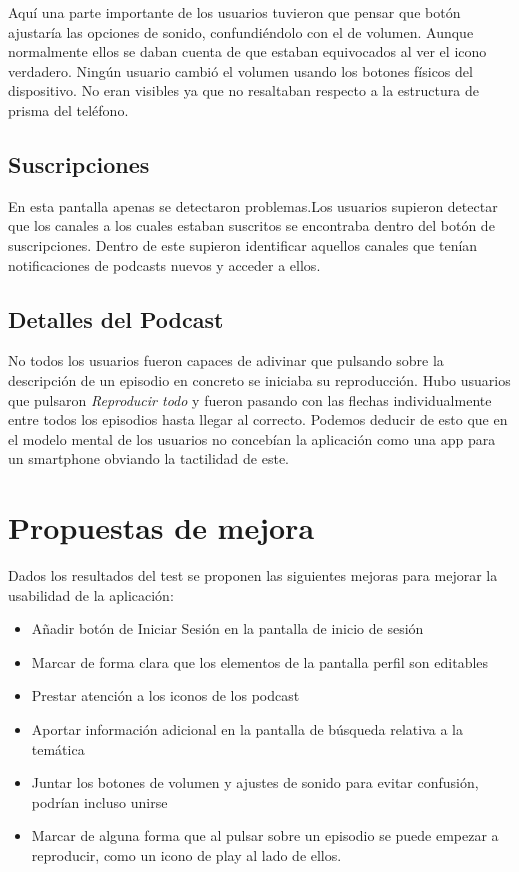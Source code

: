 \documentclass[a4paper]{article}
\begin{document}
Aquí una parte importante de los usuarios tuvieron que pensar que botón ajustaría las opciones de sonido, confundiéndolo con el de volumen. Aunque normalmente ellos se daban cuenta de que estaban equivocados al ver el icono verdadero. Ningún usuario cambió el volumen usando los botones físicos del dispositivo. No eran visibles ya que no resaltaban respecto a la estructura de prisma del teléfono.

\subsection{Suscripciones}

En esta pantalla apenas se detectaron problemas.Los usuarios supieron detectar que los canales a los cuales estaban suscritos se encontraba dentro del botón de suscripciones. Dentro de este supieron identificar aquellos canales que tenían notificaciones de podcasts nuevos y acceder a ellos. 

\subsection{Detalles del Podcast}

No todos los usuarios fueron capaces de adivinar que pulsando sobre la descripción de un episodio en concreto se iniciaba su reproducción. Hubo usuarios que pulsaron \textit{Reproducir todo} y fueron pasando con las flechas individualmente entre todos los episodios hasta llegar al correcto. Podemos deducir de esto que en el modelo mental de los usuarios no concebían la aplicación como una app para un smartphone obviando la tactilidad de este.

\section{Propuestas de mejora}

Dados los resultados del test se proponen las siguientes mejoras para mejorar la usabilidad de la aplicación:

\begin{itemize}
\item Añadir botón de Iniciar Sesión en la pantalla de inicio de sesión
\item Marcar de forma clara que los elementos de la pantalla perfil son editables
\item Prestar atención a los iconos de los podcast
\item Aportar información adicional en la pantalla de búsqueda relativa a la temática
\item Juntar los botones de volumen y ajustes de sonido para evitar confusión, podrían incluso unirse
\item Marcar de alguna forma que al pulsar sobre un episodio se puede empezar a reproducir, como un icono de play al lado de ellos.
\end{itemize}
\end{document}
